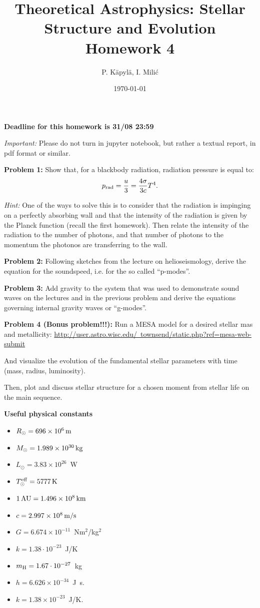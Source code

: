 \documentclass[12pt]{article}
\title{Theoretical Astrophysics: Stellar Structure and Evolution\\
Homework 4}
\author{P. K\"{a}pyl\"{a}, I. Mili\'{c}}
\date{\today}
\begin{document}
\maketitle

\textbf{Deadline for this homework is \textbf{31/08 23:59}}

\emph{Important:} Please do not turn in jupyter notebook, but rather a textual report, in pdf format or similar.

{\bf Problem 1:} Show that, for a blackbody radiation, radiation pressure is equal to: 
\begin{equation}
p_{\rm rad} = \frac{u}{3} = \frac{4 \sigma}{3c} T^4.
\end{equation}

\emph{Hint: } One of the ways to solve this is to consider that the radiation is impinging on a perfectly absorbing wall and that the intensity of the radiation is given by the Planck function (recall the first homework). Then relate the intensity of the radiation to the number of photons, and that number of photons to the momentum the photonos are transferring to the wall. 

{\bf Problem 2:} Following sketches from the lecture on helioseismology, derive the equation for the soundspeed, i.e. for the so called ``p-modes''. 

{\bf Problem 3:} Add gravity to the system that was used to demonstrate sound waves on the lectures and in the previous problem and derive the equations governing internal gravity waves or ``g-modes''.

{\bf Problem 4 (Bonus problem!!!):} Run a MESA model for a desired stellar mas and metallicity: \href{http://user.astro.wisc.edu/~townsend/static.php?ref=mesa-web-submit}{http://user.astro.wisc.edu/~townsend/static.php?ref=mesa-web-submit}

And visualize the evolution of the fundamental stellar parameters with time (mass, radius, luminosity). 

Then, plot and discuss stellar structure for a chosen moment from stellar life on the main sequence. 


{\bf Useful physical constants}
\begin{itemize}
  \item $R_{\odot} = 696 \times 10^6\,{\rm m}$
  \item $M_{\odot} = 1.989 \times 10^{30}\,{\rm kg}$
  \item $L_{\odot} = 3.83 \times 10^{26}$~W
  \item $T^{\rm eff}_{\odot} = 5777\,{\rm K}$
  \item $1\,{\rm AU} = 1.496 \times 10^8\,{\rm km}$
  \item $c = 2.997 \times 10^8\,{\rm m/s}$
  \item $G = 6.674 \times 10^{-11}$~Nm$^2$/kg$^2$
  \item $k = 1.38\cdot10^{-23}$~J/K
  \item $m_{\rm H} = 1.67\cdot10^{-27}$~kg
  \item $h=6.626 \times 10^{-34}$~J~s.
  \item $k=1.38 \times 10^{-23}$~J/K.
\end{itemize}
\end{document}
